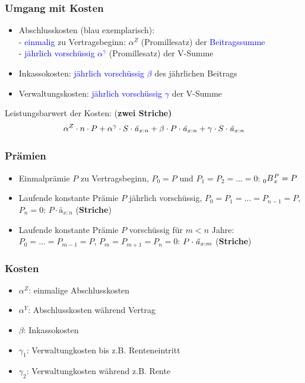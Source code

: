 \documentclass[12pt]{report}
\theoremstyle{dotless}
\theoremstyle{definition}
\begin{document}
\subsubsection{Umgang mit Kosten}
\begin{itemize}
\item Abschlusskosten (blau exemplarisch):\\
- \textcolor{blue}{einmalig} zu Vertragsbeginn: $\alpha^Z$ (Promillesatz) der \textcolor{blue}{Beitragssumme}\\
- \textcolor{blue}{jährlich vorschüssig $\alpha^\gamma$} (Promillesatz) der V-Summe
\item Inkassokosten: \textcolor{blue}{jährlich vorschüssig $\beta$} des jährlichen Beitrags
\item Verwaltungskosten: \textcolor{blue}{jährlich vorschüssig $\gamma$} der V-Summe
\end{itemize}
Leistungsbarwert der Kosten: (\textbf{zwei Striche)}
\begin{equation}
\alpha^Z \cdot n \cdot P + \alpha^\gamma \cdot S \cdot \text{\textit{ä}}_{x:n} + \beta \cdot P \cdot \text{\textit{ä}}_{x:n} + \gamma \cdot S \cdot \text{\textit{ä}}_{x:n}
\end{equation}

\subsubsection{Prämien}
\begin{itemize}
\item Einmalprämie $P$ zu Vertragsbeginn, $P_0=P$ und $P_1=P_2=...=0$: $\tensor[_0]{B}{}_x^P = P$
\item Laufende konstante Prämie $P$ jährlich vorschüssig, $P_0=P_1=...=P_{n-1}=P$, $P_n=0$: $P\cdot ä_{x:n}$ (\textbf{Striche})
\item Laufende konstante Prämie $P$ vorschüssig für $m<n$ Jahre: $P_0=...=P_{m-1}=P$, $P_m=P_{m+1}=P_n=0$: $P\cdot \text{\textit{ä}}_{x:m}$ (\textbf{Striche})
\end{itemize}

\subsubsection{Kosten}
\begin{itemize}
\item $\alpha^Z$: einmalige Abschlusskosten
\item $\alpha^Y$: Abschlusskosten während Vertrag
\item $\beta$: Inkassokosten
\item $\gamma_1$: Verwaltungkosten bis z.B. Renteneintritt
\item $\gamma_2$: Verwaltungkosten während z.B. Rente
\end{itemize}
\end{document}
